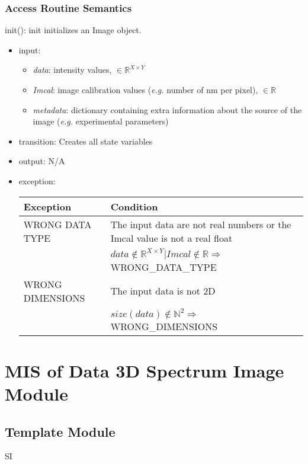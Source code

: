 \documentclass[12pt, titlepage]{article}
\begin{document}
\subsubsection{Access Routine Semantics}

\noindent init():
init initializes an Image object.
\begin{itemize}
    \item input:
    \begin{itemize}
        \item \textit{data}: intensity values, $\in \mathbb{R}^{X \times Y}$
        \item \textit{Imcal}: image calibration values (\textit{e.g.} number of \si{\nano\metre} per pixel), $\in \mathbb{R}$
        \item \textit{metadata}: dictionary containing extra information about the source of the image (\textit{e.g.} experimental parameters)
    \end{itemize}
    \item transition: Creates all state variables
    \item output: N/A
    \item exception:
    \begin{center}
        \begin{tabular}{p{4cm} p{11.5cm}}
            \toprule[0.15em]
            \textbf{Exception} & \textbf{Condition}\\
            \midrule[0.1em]
            WRONG DATA TYPE & The input data are not real numbers or the Imcal value is not a real float\\
            & $data \notin \mathbb{R}^{X \times Y}  | Imcal \notin \mathbb{R} \Rightarrow$ WRONG\_DATA\_TYPE \\ 
            \midrule[0.05em]
            WRONG DIMENSIONS & The input data is not 2D\\
            & $size(data) \notin \mathbb{N}^2 \Rightarrow $ WRONG\_DIMENSIONS\\
            \bottomrule[0.15em]
        \end{tabular}
    \end{center}
\end{itemize}

\section{MIS of Data 3D Spectrum Image Module} \label{Mod:SI}

\subsection{Template Module}
SI
\end{document}
